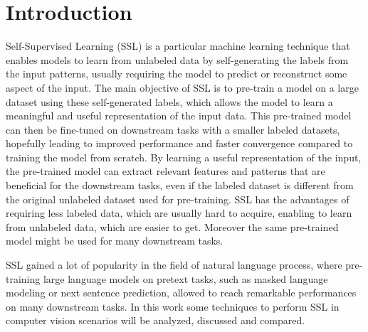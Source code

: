 \documentclass[12pt]{article}
\begin{document}
	\section{Introduction}
	Self-Supervised Learning (SSL) is a particular machine learning technique that enables models to learn from unlabeled data by self-generating the labels from the input patterns, usually requiring the model to predict or reconstruct some aspect of the input. The main objective of SSL is to pre-train a model on a large dataset using these self-generated labels, which allows the model to learn a meaningful and useful representation of the input data. This pre-trained model can then be fine-tuned on downstream tasks with a smaller labeled datasets, hopefully leading to improved performance and faster convergence compared to training the model from scratch. By learning a useful representation of the input, the pre-trained model can extract relevant features and patterns that are beneficial for the downstream tasks, even if the labeled dataset is different from the original unlabeled dataset used for pre-training. SSL has the advantages of requiring less labeled data, which are usually hard to acquire, enabling to learn from unlabeled data, which are easier to get. Moreover the same pre-trained model might be used for many downstream tasks. 
	
	SSL gained a lot of popularity in the field of natural language process, where pre-training large language models on pretext tasks, such as masked language modeling or next sentence prediction, allowed to reach remarkable performances on many downstream tasks. In this work some techniques to perform SSL in computer vision scenarios will be analyzed, discussed and compared.
	
\end{document}

